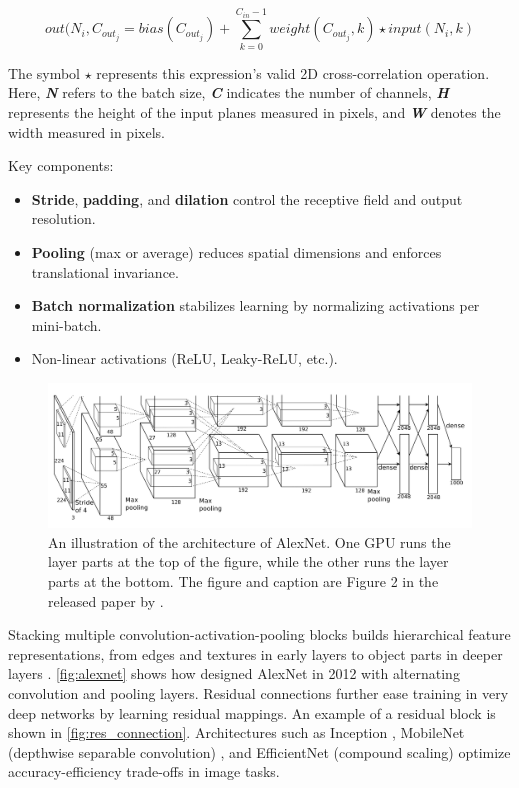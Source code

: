 \[out(N_i, C_{out_j}=bias(C_{out_j})+\sum_{k=0}^{C_{in}-1}weight(C_{out_j},k)\star input(N_i,k)\]

The symbol \(\star\) represents this expression's valid 2D cross-correlation operation. Here, \textit{\textbf{N}} refers to the batch size, \textit{\textbf{C}} indicates the number of channels, \textit{\textbf{H}} represents the height of the input planes measured in pixels, and \textit{\textbf{W}} denotes the width measured in pixels\cite{pytorch_conv2d}. 

Key components:
\begin{itemize}
    \item \textbf{Stride}, \textbf{padding}, and \textbf{dilation} control the receptive field and output resolution.
    \item \textbf{Pooling} (max or average) reduces spatial dimensions and enforces translational invariance.
    \item \textbf{Batch normalization} stabilizes learning by normalizing activations per mini-batch.
    \item Non-linear activations (ReLU, Leaky-ReLU, etc.). 
\end{itemize}

\begin{figure}
    \centering
    \includegraphics[width=1\linewidth]{figures/alexnet.png}
    \caption{An illustration of the architecture of AlexNet. One GPU runs the layer parts at the top of the figure, while the other runs the layer parts at the bottom. The figure and caption are Figure 2 in the released paper by \textcite{krizhevsky_alexnet}.}
    \label{fig:alexnet}
\end{figure}

Stacking multiple convolution-activation-pooling blocks builds hierarchical feature representations, from edges and textures in early layers to object parts in deeper layers \cite{lecun_deep_learning_2015}. \autoref{fig:alexnet} shows how \textcite{krizhevsky_alexnet} designed AlexNet in 2012 with alternating convolution and pooling layers. Residual connections \cite{he_deep_residual_2015} further ease training in very deep networks by learning residual mappings. An example of a residual block is shown in \autoref{fig:res_connection}. Architectures such as Inception \cite{szegedy_going_2014}, MobileNet (depthwise separable convolution) \cite{howard_mobilenets_2017}, and EfficientNet (compound scaling) \cite{tan_efficientnet_2020} optimize accuracy-efficiency trade-offs in image tasks. 

